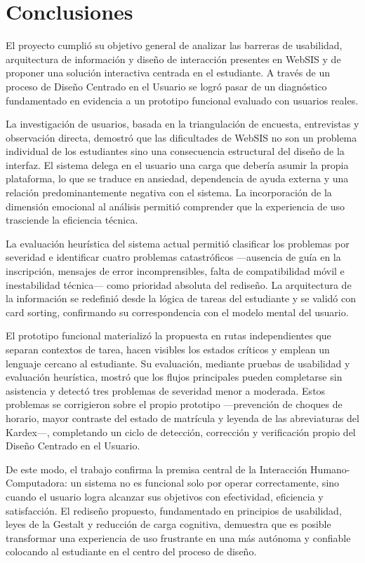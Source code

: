 \section{Conclusiones}

El proyecto cumplió su objetivo general de analizar las barreras de usabilidad, arquitectura de información y diseño de interacción presentes en WebSIS y de proponer una solución interactiva centrada en el estudiante. A través de un proceso de Diseño Centrado en el Usuario se logró pasar de un diagnóstico fundamentado en evidencia a un prototipo funcional evaluado con usuarios reales.

La investigación de usuarios, basada en la triangulación de encuesta, entrevistas y observación directa, demostró que las dificultades de WebSIS no son un problema individual de los estudiantes sino una consecuencia estructural del diseño de la interfaz. El sistema delega en el usuario una carga que debería asumir la propia plataforma, lo que se traduce en ansiedad, dependencia de ayuda externa y una relación predominantemente negativa con el sistema. La incorporación de la dimensión emocional al análisis permitió comprender que la experiencia de uso trasciende la eficiencia técnica.

La evaluación heurística del sistema actual permitió clasificar los problemas por severidad e identificar cuatro problemas catastróficos —ausencia de guía en la inscripción, mensajes de error incomprensibles, falta de compatibilidad móvil e inestabilidad técnica— como prioridad absoluta del rediseño. La arquitectura de la información se redefinió desde la lógica de tareas del estudiante y se validó con card sorting, confirmando su correspondencia con el modelo mental del usuario.

El prototipo funcional materializó la propuesta en rutas independientes que separan contextos de tarea, hacen visibles los estados críticos y emplean un lenguaje cercano al estudiante. Su evaluación, mediante pruebas de usabilidad y evaluación heurística, mostró que los flujos principales pueden completarse sin asistencia y detectó tres problemas de severidad menor a moderada. Estos problemas se corrigieron sobre el propio prototipo —prevención de choques de horario, mayor contraste del estado de matrícula y leyenda de las abreviaturas del Kardex—, completando un ciclo de detección, corrección y verificación propio del Diseño Centrado en el Usuario.

De este modo, el trabajo confirma la premisa central de la Interacción Humano-Computadora: un sistema no es funcional solo por operar correctamente, sino cuando el usuario logra alcanzar sus objetivos con efectividad, eficiencia y satisfacción. El rediseño propuesto, fundamentado en principios de usabilidad, leyes de la Gestalt y reducción de carga cognitiva, demuestra que es posible transformar una experiencia de uso frustrante en una más autónoma y confiable colocando al estudiante en el centro del proceso de diseño.

